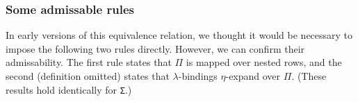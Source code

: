 \documentclass[authoryear, acmsmall, screen, review, nonacm]{acmart}
\begin{document}
\subsubsection{Some admissable rules} In early versions of this equivalence relation, we thought it would be necessary to impose the following two rules directly. However, we can confirm their admissability. The first rule states that $\Pi$ is mapped over nested rows, and the second (definition omitted) states that $\lambda$-bindings $\eta$-expand over $\Pi$. (These results hold identically for \verb!Σ!.)

\begin{code}%
\>[0]\AgdaSpace{}%
\AgdaSymbol{:}%
\>[2621I]\AgdaSpace{}%
\AgdaSymbol{\{}\AgdaSymbol{\}}\AgdaSpace{}%
\AgdaSymbol{\{}\AgdaSpace{}%
\AgdaSymbol{:}\AgdaSpace{}%
\AgdaSpace{}%
\AgdaSpace{}%
\AgdaOperator{\AgdaInductiveConstructor{R[}}\AgdaSpace{}%
\AgdaSpace{}%
\AgdaOperator{\AgdaInductiveConstructor{]}}\AgdaSymbol{\}\{}\AgdaSpace{}%
\AgdaSymbol{:}\AgdaSpace{}%
\AgdaSpace{}%
\AgdaSymbol{(}\AgdaSpace{}%
\AgdaSymbol{)\}}\AgdaSpace{}%
\<%
\\
\>[.][@{}l@{}]\<[2621I]%
\>[8]\AgdaSymbol{(}\AgdaSpace{}%
\AgdaSymbol{\{}\AgdaSpace{}%
\AgdaSymbol{=}\AgdaSpace{}%
\AgdaSymbol{\}}\AgdaSpace{}%
\AgdaSpace{}%
\AgdaSymbol{(}\AgdaSpace{}%
\AgdaSpace{}%
\AgdaSymbol{))}\AgdaSpace{}%
\AgdaSpace{}%
\AgdaSymbol{(}\AgdaSpace{}%
\AgdaSpace{}%
\AgdaSymbol{(}\AgdaSpace{}%
\AgdaSymbol{\{}\AgdaSpace{}%
\AgdaSymbol{=}\AgdaSpace{}%
\AgdaSymbol{\}}\AgdaSpace{}%
\AgdaSpace{}%
\AgdaSymbol{))}\<%
\\
\>[0]\AgdaSpace{}%
\AgdaSymbol{=}\AgdaSpace{}%
\AgdaSpace{}%
\AgdaSpace{}%
\<%
\\
%
\\[\AgdaEmptyExtraSkip]%
\>[0]\AgdaSpace{}%
\AgdaSymbol{:}%
\>[2656I]\AgdaSpace{}%

\end{code}
\end{document}
